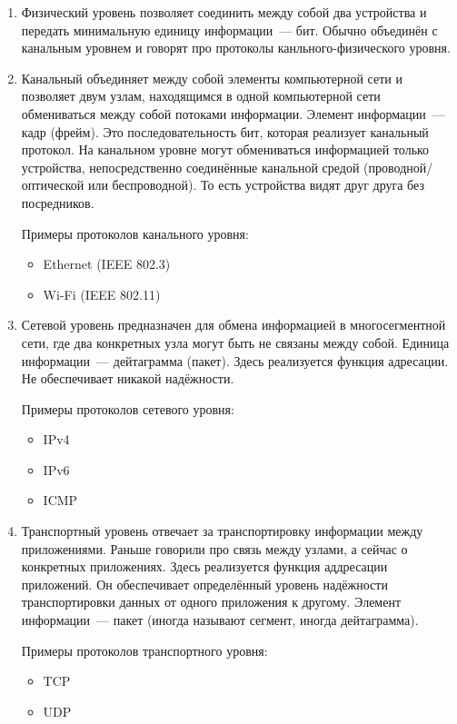\begin{enumerate}

\item Физический уровень позволяет соединить между собой два устройства и передать минимальную единицу информации~--- бит. Обычно объединён с канальным уровнем и говорят про протоколы канльного-физического уровня.

\item Канальный объединяет между собой элементы компьютерной сети и позволяет двум узлам, находящимся в одной компьютерной сети обмениваться между собой потоками информации. Элемент информации~--- кадр (фрейм). Это последовательность бит, которая реализует канальный протокол. На канальном уровне могут обмениваться информацией только устройства, непосредственно соединённые канальной средой (проводной/оптической или беспроводной). То есть устройства видят друг друга без посредников. 

Примеры протоколов канального уровня: 
\begin{itemize}
    \item Ethernet (IEEE 802.3)
    \item Wi-Fi (IEEE 802.11)
\end{itemize}

\item Сетевой уровень предназначен для обмена информацией в многосегментной сети, где два конкретных узла могут быть не связаны между собой. Единица информации~--- дейтаграмма (пакет). Здесь реализуется функция адресации. Не обеспечивает никакой надёжности.

Примеры протоколов сетевого уровня:
\begin{itemize}
    \item IPv4
    \item IPv6
    \item ICMP
\end{itemize}

\item Транспортный уровень отвечает за транспортировку информации между приложениями. Раньше говорили про связь между узлами, а сейчас о конкретных приложениях. Здесь реализуется функция аддресации приложений. Он обеспечивает определённый уровень надёжности транспортировки данных от одного приложения к другому. Элемент информации~--- пакет (иногда называют сегмент, иногда дейтаграмма).

Примеры протоколов транспортного уровня:
\begin{itemize}
    \item TCP
    \item UDP
\end{itemize}


\end{enumerate}
